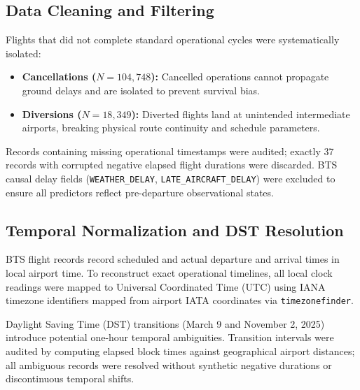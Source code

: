 \documentclass[conference]{IEEEtran}
\begin{document}
\subsection{Data Cleaning and Filtering}
Flights that did not complete standard operational cycles were systematically isolated:
\begin{itemize}
    \item \textbf{Cancellations ($N = 104,748$):} Cancelled operations cannot propagate ground delays and are isolated to prevent survival bias.
    \item \textbf{Diversions ($N = 18,349$):} Diverted flights land at unintended intermediate airports, breaking physical route continuity and schedule parameters.
\end{itemize}
Records containing missing operational timestamps were audited; exactly 37 records with corrupted negative elapsed flight durations were discarded. BTS causal delay fields (\texttt{WEATHER\_DELAY}, \texttt{LATE\_AIRCRAFT\_DELAY}) were excluded to ensure all predictors reflect pre-departure observational states.

\subsection{Temporal Normalization and DST Resolution}
BTS flight records record scheduled and actual departure and arrival times in local airport time. To reconstruct exact operational timelines, all local clock readings were mapped to Universal Coordinated Time (UTC) using IANA timezone identifiers mapped from airport IATA coordinates via \texttt{timezonefinder}. 

Daylight Saving Time (DST) transitions (March 9 and November 2, 2025) introduce potential one-hour temporal ambiguities. Transition intervals were audited by computing elapsed block times against geographical airport distances; all ambiguous records were resolved without synthetic negative durations or discontinuous temporal shifts.

\begin{table}[t]
\caption{Chronological Partitioning of 2025 BTS Rotations}
\label{tab:dataset_split}
\centering
{}
\end{table}
\end{document}
